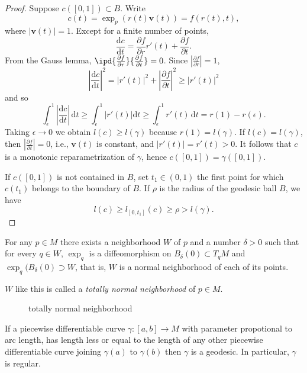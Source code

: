 \begin{proof}
  Suppose $c([0,1])\subset B$.
  Write 
  \[
    c(t)=\exp_p(r(t)\mathbf{v}(t))=f(r(t),t),
  \] 
  where $|\mathbf{v}(t)|=1$. Except for a finite number of points,
  \[
    \frac{\mathrm{d}c}{\mathrm{d}t}= \frac{\partial f}{\partial r}r'(t)+ \frac{\partial f}{\partial t} .
  \] 
  From the Gauss lemma, $\ipd{\frac{\partial f}{\partial r} }{\frac{\partial f}{\partial t} }=0$. Since $\left| \frac{\partial f}{\partial r}  \right| =1$,
  \[
    \left| \frac{\mathrm{d}c}{\mathrm{d}t} \right| ^2=|r'(t)|^2+\left| \frac{\partial f}{\partial t} \right| ^2\ge |r'(t)|^2
  \] 
  and so 
  \[
    \int_{\epsilon }^{1}\left| \frac{\mathrm{d}c}{\mathrm{d}t} \right| \,\mathrm{d}t\ge \int_\epsilon ^{1}|r'(t)|\mathrm{d}t\ge \int_{\epsilon }^{1}r'(t)\,\mathrm{d}t=r(1)-r(\epsilon ).
  \] 
  Taking $\epsilon \to 0$ we obtain $l(c)\ge l(\gamma)$ because $r(1)=l(\gamma)$. If $l(c)=l(\gamma)$, then $\left| \frac{\partial f}{\partial t}  \right| =0$, i.e., $\mathbf{v}(t)$ is constant, and $|r'(t)|=r'(t)>0$. It follows that $c$ is a monotonic reparametrization of $\gamma$, hence $c([0,1])=\gamma\left( [0,1] \right) $.

  If $c\left( [0,1] \right) $ is not contained in $B$, set  $t_1\in (0,1)$ the first point for which  $c(t_1)$ belongs to the boundary of $B$. If $\rho$ is the radius of the geodesic ball $B$, we have
  \[
    l(c)\ge l_{[0,t_1]}(c)\ge \rho> l(\gamma).
  \] 
\end{proof}
\begin{theorem}
  For any  $p\in M$ there exists a neighborhood $W$ of $p$ and a number $\delta>0$ such that for every $q\in W$, $\exp_q$ is a diffeomorphism on $B_{\delta}(0)\subset T_qM$ and $\exp_q(B_{\delta}(0)\supset W$, that is, $W$ is a normal neighborhood of each of its points. 
\end{theorem}
$W$ like this is called a \textit{totally normal neighborhood} of $p\in M$.
\begin{figure}[ht]
    \centering
    \caption{totally normal neighborhood}
    \label{fig:totally-normal-neighborhood}
\end{figure}
\begin{corollary}\label{crc-2}
  If a piecewise differentiable curve $\gamma:[a,b]\to M$ with parameter propotional to arc length, has length less or equal to the length of any other piecewise differentiable curve joining $\gamma(a)$ to $\gamma(b)$ then $\gamma$ is a geodesic. In particular, $\gamma$ is regular.
\end{corollary}

